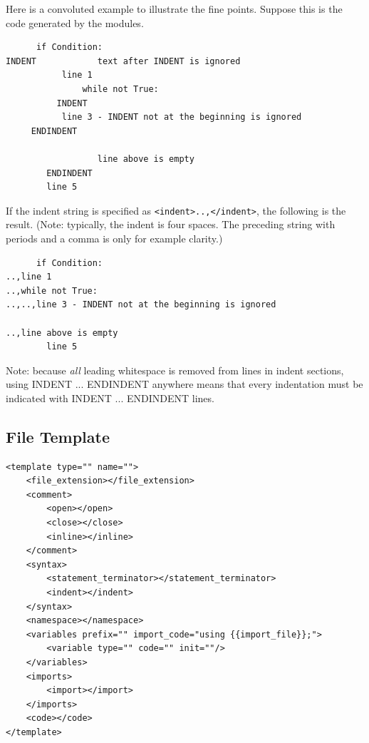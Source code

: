 \documentclass[12pt]{article}
\begin{document}
Here is a convoluted example to illustrate the fine points.  Suppose this is the
code generated by the modules.
\begin{verbatim}
      if Condition:
INDENT            text after INDENT is ignored
           line 1
               while not True:
          INDENT
           line 3 - INDENT not at the beginning is ignored
     ENDINDENT

                  line above is empty
        ENDINDENT
        line 5
\end{verbatim}
If the indent string is specified as \verb|<indent>..,</indent>|, the following is
the result. (Note: typically, the indent is four spaces. The preceding string with
periods and a comma is only for example clarity.)
\begin{verbatim}
      if Condition:
..,line 1
..,while not True:
..,..,line 3 - INDENT not at the beginning is ignored

..,line above is empty
        line 5
\end{verbatim}

Note: because \emph{all} leading whitespace is removed from lines in indent sections,
using INDENT ... ENDINDENT anywhere means that every indentation must be indicated
with INDENT ... ENDINDENT lines.


\subsection{File Template}
\label{sec: file template}

\begin{verbatim}
<template type="" name="">
    <file_extension></file_extension>
    <comment>
        <open></open>
        <close></close>
        <inline></inline>
    </comment>
    <syntax>
        <statement_terminator></statement_terminator>
        <indent></indent>
    </syntax>
    <namespace></namespace>
    <variables prefix="" import_code="using {{import_file}};">
        <variable type="" code="" init=""/>
    </variables>
    <imports>
        <import></import>
    </imports>
    <code></code>
</template>
\end{verbatim}
\end{document}
